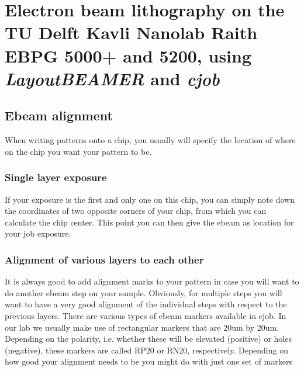 \chapter{Electron beam lithography on the TU Delft Kavli Nanolab Raith EBPG 5000+ and 5200, using \textit{LayoutBEAMER} and \textit{cjob}}
\label{app:ebeam}

\section{Ebeam alignment}
When writing patterns onto a chip, you usually will specify the location of where on the chip you want your pattern to be.

\subsection{Single layer exposure}
If your exposure is the first and only one on this chip, you can simply note down the coordinates of two opposite corners of your chip, from which you can calculate the chip center. This point you can then give the ebeam as location for your job exposure.

\subsection{Alignment of various layers to each other}
It is always good to add alignment marks to your pattern in case you will want to do another ebeam step on your sample. Obviously, for multiple steps you will want to have a very good alignment of the individual steps with respect to the previous layers. There are various types of ebeam markers available in cjob. In our lab we usually make use of rectangular markers that are 20um by 20um. Depending on the polarity, i.e. whether these will be elevated (positive) or holes (negative), these markers are called RP20 or RN20, respectively.
Depending on how good your alignment needs to be you might do with just one set of markers

